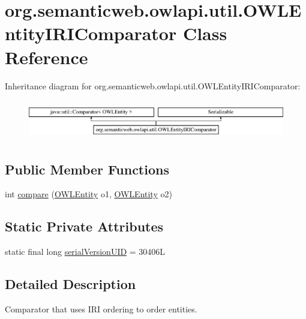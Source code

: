 \hypertarget{classorg_1_1semanticweb_1_1owlapi_1_1util_1_1_o_w_l_entity_i_r_i_comparator}{\section{org.\-semanticweb.\-owlapi.\-util.\-O\-W\-L\-Entity\-I\-R\-I\-Comparator Class Reference}
\label{classorg_1_1semanticweb_1_1owlapi_1_1util_1_1_o_w_l_entity_i_r_i_comparator}
}
Inheritance diagram for org.\-semanticweb.\-owlapi.\-util.\-O\-W\-L\-Entity\-I\-R\-I\-Comparator\-:\begin{figure}[H]
\begin{center}
\leavevmode
\includegraphics[height=1.761006cm]{classorg_1_1semanticweb_1_1owlapi_1_1util_1_1_o_w_l_entity_i_r_i_comparator}
\end{center}
\end{figure}
\subsection*{Public Member Functions}
\begin{DoxyCompactItemize}
\item 
int \hyperlink{classorg_1_1semanticweb_1_1owlapi_1_1util_1_1_o_w_l_entity_i_r_i_comparator_a0d5943873953b6beff78cc905d6af9df}{compare} (\hyperlink{interfaceorg_1_1semanticweb_1_1owlapi_1_1model_1_1_o_w_l_entity}{O\-W\-L\-Entity} o1, \hyperlink{interfaceorg_1_1semanticweb_1_1owlapi_1_1model_1_1_o_w_l_entity}{O\-W\-L\-Entity} o2)
\end{DoxyCompactItemize}
\subsection*{Static Private Attributes}
\begin{DoxyCompactItemize}
\item 
static final long \hyperlink{classorg_1_1semanticweb_1_1owlapi_1_1util_1_1_o_w_l_entity_i_r_i_comparator_aac40fa25f0f63ab8b54fbd34a56f3e88}{serial\-Version\-U\-I\-D} = 30406\-L
\end{DoxyCompactItemize}


\subsection{Detailed Description}
Comparator that uses I\-R\-I ordering to order entities. 

